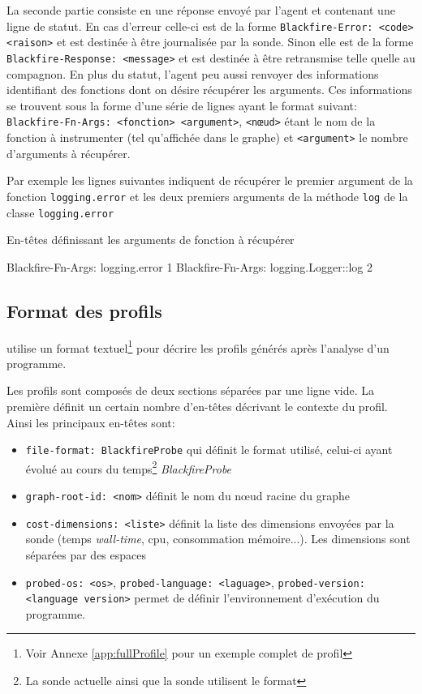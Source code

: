 La seconde partie consiste en une réponse envoyé par l'agent et contenant une ligne de statut. En cas d'erreur celle-ci est de la forme \verb|Blackfire-Error: <code> <raison>| et est destinée à être journalisée par la sonde. Sinon elle est de la forme \verb|Blackfire-Response: <message>| et est destinée à être retransmise telle quelle au compagnon. En plus du statut, l'agent peu aussi renvoyer des informations identifiant des fonctions dont on désire récupérer les arguments. Ces informations se trouvent sous la forme d'une série de lignes ayant le format suivant: \verb|Blackfire-Fn-Args: <fonction> <argument>|,
\verb|<nœud>| étant le nom de la fonction à instrumenter (tel qu'affichée dans le graphe) et \verb|<argument>| le nombre d'arguments à récupérer.

Par exemple les lignes suivantes indiquent de récupérer le premier argument de la fonction \verb|logging.error| et les deux premiers arguments de la méthode \verb|log| de la classe \verb|logging.error|
\begin{listing}[H]
\caption{En-têtes définissant les arguments de fonction à récupérer}
\begin{textcode}
Blackfire-Fn-Args: logging.error 1
Blackfire-Fn-Args: logging.Logger::log 2
\end{textcode}
\end{listing}

				\subsection{Format des profils}
\Blackfire utilise un format textuel\footnote{Voir Annexe \vref{app:fullProfile} pour un exemple complet de profil} pour décrire les profils générés après l'analyse d'un programme.

Les profils sont composés de deux sections séparées par une ligne vide. La première définit un certain nombre d'en-têtes décrivant le contexte du profil. Ainsi les principaux en-têtes sont:
\begin{itemize}
\item \verb|file-format: BlackfireProbe| qui définit le format utilisé, celui-ci ayant évolué au cours du temps\footnote{La sonde \PHP actuelle ainsi que la sonde \Python utilisent le format} \emph{BlackfireProbe}
\item \verb|graph-root-id: <nom>| définit le nom du nœud racine du graphe
\item \verb|cost-dimensions: <liste>| définit la liste des dimensions envoyées par la sonde (temps \emph{wall-time}, cpu, consommation mémoire...). Les dimensions sont séparées par des espaces
\item \verb|probed-os: <os>|, \verb|probed-language: <laguage>|, \verb|probed-version: <language version>| permet de définir l'environnement d'exécution du programme.
\end{itemize}

